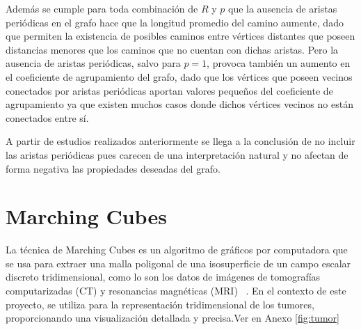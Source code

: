 Adem\'as se cumple para toda combinaci\'on de $R$ y $p$ que la ausencia de aristas peri\'odicas en el grafo hace que la longitud promedio del camino aumente, dado que permiten la existencia de posibles caminos entre v\'ertices distantes que poseen distancias menores que los caminos que no cuentan con dichas aristas. Pero la ausencia de aristas peri\'odicas, salvo para $p=1$, provoca tambi\'en un aumento en el coeficiente de agrupamiento del grafo, dado que los v\'ertices que poseen vecinos conectados por aristas peri\'odicas aportan valores peque\~nos del coeficiente de agrupamiento ya que existen muchos casos donde dichos v\'ertices vecinos no est\'an conectados entre s\'i.

A partir de estudios realizados anteriormente \cite{viabarre2019} se llega a la conclusión de no incluir las aristas periódicas pues carecen de una interpretación natural y no afectan de forma negativa las propiedades deseadas del grafo. %

\section{Marching Cubes}

La técnica de Marching Cubes es un algoritmo de gráficos por computadora que se usa para extraer una malla poligonal de una isosuperficie de un campo escalar discreto tridimensional, como lo son los datos de imágenes de tomografías computarizadas (CT) y resonancias magnéticas (MRI) ~\cite{lorensen1987}. En el contexto de este proyecto, se utiliza para la representación tridimensional de los tumores, proporcionando una visualización detallada y precisa.Ver en Anexo \ref{fig:tumor}

